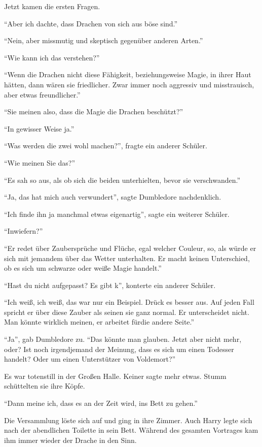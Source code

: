 Jetzt kamen die ersten Fragen.

\enquote{Aber ich dachte, dass Drachen von sich aus böse sind.}

\enquote{Nein, aber missmutig und skeptisch gegenüber anderen Arten.}

\enquote{Wie kann ich das verstehen?}

\enquote{Wenn die Drachen nicht diese Fähigkeit, beziehungsweise Magie, in ihrer Haut hätten, dann wären sie friedlicher. Zwar immer noch aggressiv und misstrauisch, aber etwas freundlicher.}

\enquote{Sie meinen also, dass die Magie die Drachen beschützt?}

\enquote{In gewisser Weise ja.}

\enquote{Was werden die zwei wohl machen?}, fragte ein anderer Schüler.

\enquote{Wie meinen Sie das?}

\enquote{Es sah so aus, als ob sich die beiden unterhielten, bevor sie verschwanden.}

\enquote{Ja, das hat mich auch verwundert}, sagte Dumbledore nachdenklich.

\enquote{Ich finde ihn ja manchmal etwas eigenartig}, sagte ein weiterer Schüler.

\enquote{Inwiefern?}

\enquote{Er redet über Zaubersprüche und Flüche, egal welcher Couleur, so, als würde er sich mit jemandem über das Wetter unterhalten. Er macht keinen Unterschied, ob es sich um schwarze oder weiße Magie handelt.}

\enquote{Hast du nicht aufgepasst? Es gibt k\aabs}, konterte ein anderer Schüler.

\enquote{Ich weiß, ich weiß, das war nur ein Beispiel. Drück es besser aus. Auf jeden Fall spricht er über diese Zauber als seinen sie ganz normal. Er unterscheidet nicht. Man könnte wirklich meinen, er arbeitet für\abs die andere Seite.}

\enquote{Ja}, gab Dumbledore zu. \enquote{Das könnte man glauben. Jetzt aber nicht mehr, oder? Ist noch irgendjemand der Meinung, dass es sich um einen Todesser handelt? Oder um einen Unterstützer von Voldemort?}

Es war totenstill in der Großen Halle. Keiner sagte mehr etwas. Stumm schüttelten sie ihre Köpfe.

\enquote{Dann meine ich, dass es an der Zeit wird, ins Bett zu gehen.}

Die Versammlung löste sich auf und ging in ihre Zimmer. Auch Harry legte sich nach der abendlichen Toilette in sein Bett. Während des gesamten Vortrages kam ihm immer wieder der Drache in den Sinn.

